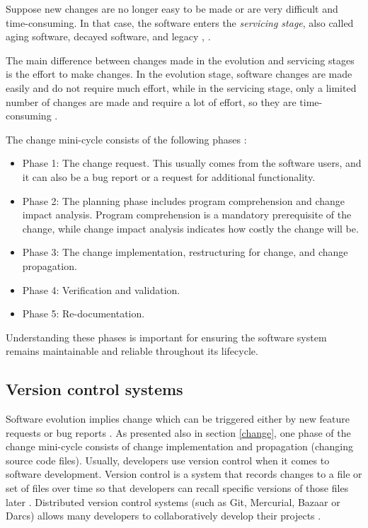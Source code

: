 Suppose new changes are no longer easy to be made or are very difficult and time-consuming. In that case, the software enters the \textit{servicing stage}, also called aging software, decayed software, and legacy \cite{Software-life-cycle}, \cite{363157}.

The main difference between changes made in the evolution and servicing stages is the effort to make changes. In the evolution stage, software changes are made easily and do not require much effort, while in the servicing stage, only a limited number of changes are made and require a lot of effort, so they are time-consuming \cite{Bennett, Rajlich, FoSEReverseEngineering}.

The change mini-cycle consists of the following phases \cite{810308}:
\begin{itemize}
\item Phase 1: The change request. This usually comes from the software users, and it can also be a bug report or a request for additional functionality.
\item Phase 2: The planning phase includes program comprehension and change impact analysis. Program comprehension is a mandatory prerequisite of the change, while change
impact analysis indicates how costly the change will be. \cite{Bohner}
\item Phase 3: The change implementation, restructuring for change, and change propagation.
\item Phase 4: Verification and validation.
\item Phase 5: Re-documentation.
\end{itemize}

Understanding these phases is important for ensuring the software system remains maintainable and reliable throughout its lifecycle.


\subsection{Version control systems}

\hspace{4em}Software evolution implies change which can be triggered either by new feature requests or bug reports \cite{articleEvolution}. As presented also in section \ref{change}, one phase of the change mini-cycle consists of change implementation and propagation (changing source code files). 
Usually, developers use version control when it comes to software development. Version control is a system that records changes to a file or set of files over time so that developers can recall specific versions of those files later \cite{svn}.
Distributed version control systems (such as Git, Mercurial, Bazaar or Darcs) allows many developers to collaboratively develop their projects \cite{7471284}.

